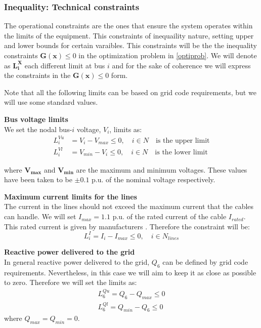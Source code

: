 \documentclass[a4paper,11pt, titlepage, twoside]{article}
\begin{document}
\subsubsection{Inequality: Technical constraints}\label{inequality}

The operational constraints are the ones that ensure the system operates within the limits of the equipment. This constraints of inequaility nature, setting 
upper and lower bounds for certain varaibles. This constraints will be the the inequality constraints $\mathbf{G(x)} \leq 0$ in the optimization problem in \ref{optiprob}. We will
denote as $\mathbf{L_i^X}$ each different limit at bus $i$ and for the sake of coherence we will express the constraints in the $\mathbf{G(x)} \leq 0$ form.\par
Note that all the following limits can be based on grid code requirements, but we will use some standard values.

\textbf{Bus voltage limits}\\
We set the nodal bus-$i$ voltage, $V_i$, limits as:
\begin{equation}
\begin{aligned}
    L_{i}^{Vu} &= V_i - V_{max} \leq 0, \quad i \in N \quad \text{is the upper limit} \\
    L_{i}^{Vl} &= V_{min} - V_i \leq 0, \quad i \in N \quad \text{is the lower limit}   
\end{aligned}    
\end{equation}

where $\mathbf{V_{max}}$ and $\mathbf{V_{min}}$ are the maximum and minimum voltages. These values have been taken to be $\pm 0.1$ p.u. of the nominal voltage respectively.

\textbf{Maximum current limits for the lines}\\
The current in the lines should not exceed the maximum current that the cables can handle. We will set $I_{max} = 1.1$ p.u. of the rated current of the cable $I_{rated}$. This rated current is given by manufacturers \cite{ABB}.
Therefore the constraint will be:
\begin{equation}
    L_{i}^{I} = I_i - I_{max} \leq 0, \quad i \in N_{lines}
\end{equation}

\textbf{Reactive power delivered to the grid}\\
In general reactive power delivered to the grid, $Q_6$ can be defined by grid code requirements. Nevertheless, in this case we will aim to keep it as close as
possible to zero. Therefore we will set the limits as:
\begin{equation}
\begin{aligned}
    L_{6}^{Qu} = Q_6 - Q_{max} \leq 0 \\
    L_{6}^{Ql} = Q_{min} - Q_{6} \leq 0
\end{aligned}
\end{equation}
where $Q_{max}=Q_{min}=0$.
\newpage
\end{document}
